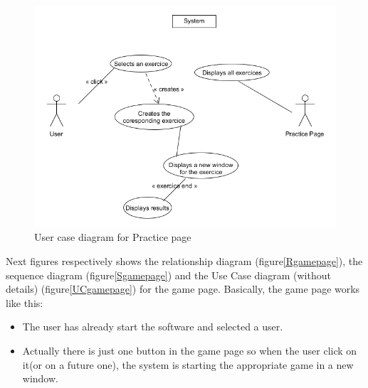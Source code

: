 \begin{figure}[H]
	\centering
    \includegraphics[width=12cm]{diagrams/UCpracticepage.png}
    \caption{User case diagram for Practice page}
    \label{UCpracticepage}
\end{figure}

Next figures respectively shows the relationship diagram (figure\ref{Rgamepage}), the sequence diagram (figure\ref{Sgamepage}) and the Use Case diagram (without details) (figure\ref{UCgamepage}) for the game page. Basically, the game page works like this:
\begin{itemize}
\item The user has already start the software and selected a user.
\item Actually there is just one button in the game page so when the user click on it(or on a future one), the system is starting the appropriate game in a new window.
\end{itemize}

